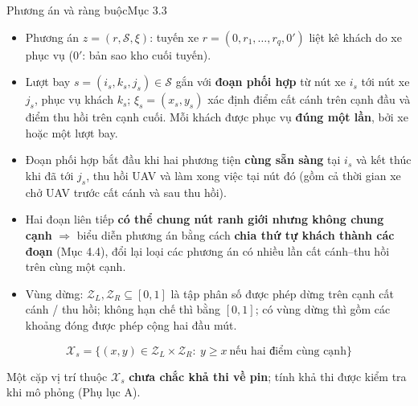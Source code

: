 \documentclass[aspectratio=169,10pt,t,xcolor={table}]{beamer}
\newcommand{\src}[1]{\hfill{\normalfont\footnotesize\color{white!62!navy}#1}}  %
\begin{document}
\begin{frame}{Phương án và ràng buộc\src{Mục 3.3}}
\begin{itemize}\footnotesize
\item Phương án $z=(r,\mathcal S,\xi)$: tuyến xe $r=(0,r_1,\ldots,r_q,0')$ liệt kê khách do xe phục vụ ($0'$: bản sao kho cuối tuyến).
\item Lượt bay $s=(i_s,k_s,j_s)\in\mathcal S$ gắn với \textbf{đoạn phối hợp} từ nút xe $i_s$ tới nút xe $j_s$, phục vụ khách $k_s$; $\xi_s=(x_s,y_s)$ xác định điểm cất cánh trên cạnh đầu và điểm thu hồi trên cạnh cuối. Mỗi khách được phục vụ \textbf{đúng một lần}, bởi xe hoặc một lượt bay.
\item Đoạn phối hợp bắt đầu khi hai phương tiện \textbf{cùng sẵn sàng} tại $i_s$ và kết thúc khi đã tới $j_s$, thu hồi UAV và làm xong việc tại nút đó (gồm cả thời gian xe chở UAV trước cất cánh và sau thu hồi).
\item Hai đoạn liên tiếp \textbf{có thể chung nút ranh giới nhưng không chung cạnh} $\Rightarrow$ biểu diễn phương án bằng cách \textbf{chia thứ tự khách thành các đoạn} (Mục 4.4), đổi lại loại các phương án có nhiều lần cất cánh--thu hồi trên cùng một cạnh.
\item Vùng dừng: $\mathcal Z_L,\mathcal Z_R\subseteq[0,1]$ là tập phân số được phép dừng trên cạnh cất cánh / thu hồi; không hạn chế thì bằng $[0,1]$; có vùng dừng thì gồm các khoảng đóng được phép cộng hai đầu mút.
\end{itemize}
\vspace{-2pt}
\begin{equation}\tag{1}
\mathcal X_s=\{(x,y)\in\mathcal Z_L\times\mathcal Z_R:\ y\ge x\ \text{nếu hai điểm cùng cạnh}\}
\end{equation}
{\footnotesize Một cặp vị trí thuộc $\mathcal X_s$ \textbf{chưa chắc khả thi về pin}; tính khả thi được kiểm tra khi mô phỏng (Phụ lục A).\par}
\end{frame}
\end{document}
